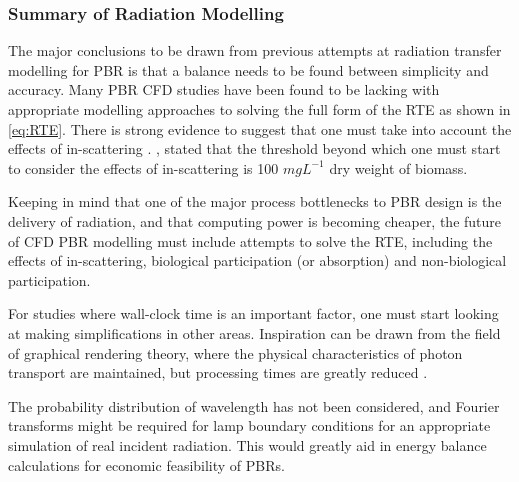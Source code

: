 

\subsubsection{Summary of Radiation Modelling}
The major conclusions to be drawn from previous attempts at radiation transfer modelling for PBR is that a balance needs to be found between simplicity and accuracy. Many PBR CFD studies have been found to be lacking with appropriate modelling approaches to solving the full form of the RTE as shown in \eqref{eq:RTE}. There is strong evidence to suggest that one must take into account the effects of in-scattering \cite{heinrich2012,kong2014,modest2003,krishnamoorthy2014,lee2014,gao2016}. \cite{heinrich2012}, stated that the threshold beyond which one must start to consider the effects of in-scattering is 100 $mg L^{-1}$ dry weight of biomass. 
\skippingparagraph

Keeping in mind that one of the major process bottlenecks to PBR design is the delivery of radiation, and that computing power is becoming cheaper, the future of CFD PBR modelling must include attempts to solve the RTE, including the effects of in-scattering, biological participation (or absorption) and non-biological participation. 
\skippingparagraph

For studies where wall-clock time is an important factor, one must start looking at making simplifications in other areas. Inspiration can be drawn from the field of graphical rendering theory, where the physical characteristics of photon transport are maintained, but processing times are greatly reduced \cite{jarosz2008}.
\skippingparagraph

The probability distribution of wavelength has not been considered, and Fourier transforms might be required for lamp boundary conditions for an appropriate simulation of real incident radiation. This would greatly aid in energy balance calculations for economic feasibility of PBRs. 

